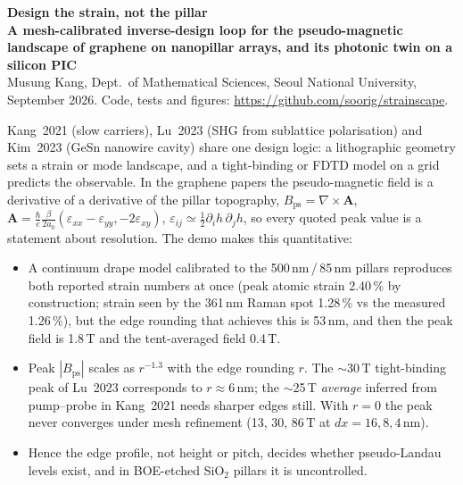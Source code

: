\documentclass[10pt,a4paper]{article}
\newcommand{\Bps}{B_{\mathrm{ps}}}
\begin{document}
{\large\bfseries Design the strain, not the pillar}\\[2pt]
{\bfseries A mesh-calibrated inverse-design loop for the pseudo-magnetic landscape of graphene on nanopillar arrays, and its photonic twin on a silicon PIC}\\[2pt]
{\small Musung Kang, Dept.\ of Mathematical Sciences, Seoul National University, September 2026.
Code, tests and figures: \url{https://github.com/soorig/strainscape}.}

\vspace{4pt}
Kang~2021 (slow carriers), Lu~2023 (SHG from sublattice polarisation) and Kim~2023 (GeSn nanowire cavity) share one design logic: a lithographic geometry sets a strain or mode landscape, and a tight-binding or FDTD model on a grid predicts the observable. In the graphene papers the pseudo-magnetic field is a derivative of a derivative of the pillar topography,
$\Bps=\nabla\times\mathbf A$, $\mathbf A=\tfrac{\hbar}{e}\tfrac{\beta}{2a_0}(\varepsilon_{xx}-\varepsilon_{yy},-2\varepsilon_{xy})$, $\varepsilon_{ij}\simeq\tfrac12\partial_ih\,\partial_jh$,
so every quoted peak value is a statement about resolution. The demo makes this quantitative:
\begin{itemize}
\item A continuum drape model calibrated to the 500\,nm\,/\,85\,nm pillars reproduces both reported strain numbers at once (peak atomic strain 2.40\,\% by construction; strain seen by the 361\,nm Raman spot 1.28\,\% vs the measured 1.26\,\%), but the edge rounding that achieves this is 53\,nm, and then the peak field is 1.8\,T and the tent-averaged field 0.4\,T.
\item Peak $|\Bps|$ scales as $r^{-1.3}$ with the edge rounding $r$. The $\sim$30\,T tight-binding peak of Lu~2023 corresponds to $r\approx6$\,nm; the $\sim$25\,T \emph{average} inferred from pump--probe in Kang~2021 needs sharper edges still. With $r=0$ the peak never converges under mesh refinement (13, 30, 86\,T at $dx=16,8,4$\,nm).
\item Hence the edge profile, not height or pitch, decides whether pseudo-Landau levels exist, and in BOE-etched SiO$_2$ pillars it is uncontrolled.
\end{itemize}
\end{document}
